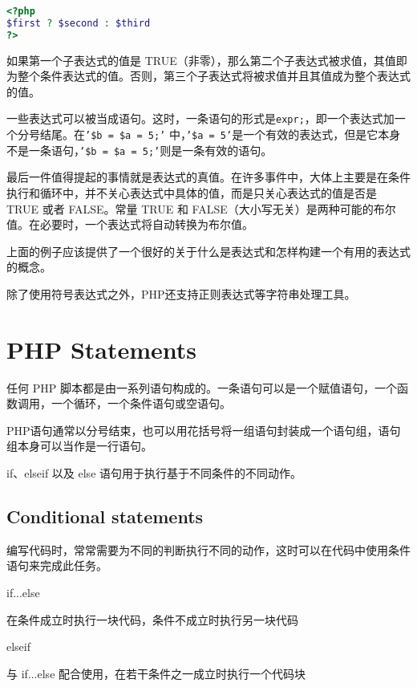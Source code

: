 \begin{lstlisting}[language=PHP]
<?php
$first ? $second : $third
?>
\end{lstlisting}

如果第一个子表达式的值是 TRUE（非零），那么第二个子表达式被求值，其值即为整个条件表达式的值。否则，第三个子表达式将被求值并且其值成为整个表达式的值。


一些表达式可以被当成语句。这时，一条语句的形式是\texttt{expr;}，即一个表达式加一个分号结尾。在\texttt{'\$b = \$a = 5;'} 中，\texttt{'\$a = 5'}是一个有效的表达式，但是它本身不是一条语句，\texttt{'\$b = \$a = 5;'}则是一条有效的语句。

最后一件值得提起的事情就是表达式的真值。在许多事件中，大体上主要是在条件执行和循环中，并不关心表达式中具体的值，而是只关心表达式的值是否是 TRUE 或者 FALSE。常量 TRUE 和 FALSE（大小写无关）是两种可能的布尔值。在必要时，一个表达式将自动转换为布尔值。

上面的例子应该提供了一个很好的关于什么是表达式和怎样构建一个有用的表达式的概念。

除了使用符号表达式之外，PHP还支持正则表达式等字符串处理工具。


\chapter{PHP Statements}

任何 PHP 脚本都是由一系列语句构成的。一条语句可以是一个赋值语句，一个函数调用，一个循环，一个条件语句或空语句。

PHP语句通常以分号结束，也可以用花括号将一组语句封装成一个语句组，语句组本身可以当作是一行语句。


if、elseif 以及 else 语句用于执行基于不同条件的不同动作。



\section{Conditional statements}

编写代码时，常常需要为不同的判断执行不同的动作，这时可以在代码中使用条件语句来完成此任务。

\begin{compactitem}
\item if...else

在条件成立时执行一块代码，条件不成立时执行另一块代码

\item elseif

与 if...else 配合使用，在若干条件之一成立时执行一个代码块
\end{compactitem}

